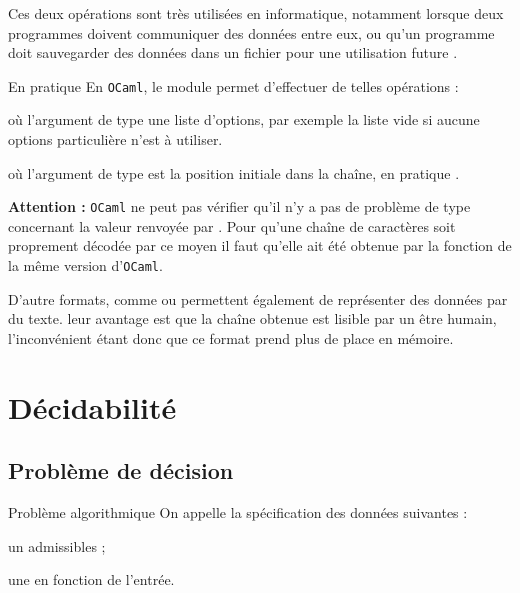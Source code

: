 \documentclass[a4paper,french,bookmarks]{book}
\newcommand{\langOcaml}{\texttt{\color{ocamlColor!20!black}OCaml}}
\begin{document}
    Ces deux opérations sont très utilisées en informatique, notamment lorsque deux programmes doivent communiquer des données entre eux, ou qu'un programme doit sauvegarder des données dans un fichier pour une utilisation future     .
    
    \begin{form}{En pratique}{}
        En \langOcaml, le module  permet d'effectuer de telles opérations :
        
        \begin{enumerate}
            \itt {} où l'argument de type  une liste d'options, par exemple la liste vide \camlline{[]} si aucune options particulière n'est à utiliser.
                
            \itt {} où l'argument de type  est la position initiale dans la chaîne, en pratique .
        \end{enumerate}
    \end{form}
    
    \textbf{\sffamily Attention :} \langOcaml{} ne peut pas vérifier qu'il n'y a pas de problème de type concernant la valeur renvoyée par . Pour qu'une chaîne de caractères soit proprement décodée par ce moyen il faut qu'elle ait été obtenue par la fonction  de la même version d'\langOcaml.
    
    \begin{example}{}{}
        D'autre formats, comme  ou  permettent également de représenter des données par du texte. leur avantage est que la chaîne obtenue est lisible par un être humain, l'inconvénient étant donc que ce format prend plus de place en mémoire. 
    \end{example}
    
    \section{Décidabilité}
    
    \subsection{Problème de décision}
    
    \begin{definition}{Problème algorithmique}{}
        On appelle  la spécification des données suivantes :
        \begin{enumerate}
            \itast un  admissibles ;
            
            \itast une  en fonction de l'entrée.
        \end{enumerate}
    \end{definition}
    
\end{document}
